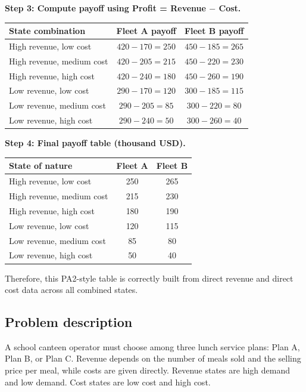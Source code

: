 \begin{ExamProblems}
		\textbf{Step 3: Compute payoff using Profit = Revenue $-$ Cost.}
		\begin{center}
			\begin{tabular}{l c c}
				\toprule
				State combination & Fleet A payoff & Fleet B payoff \\
				\midrule
				High revenue, low cost & $420-170=250$ & $450-185=265$ \\
				High revenue, medium cost & $420-205=215$ & $450-220=230$ \\
				High revenue, high cost & $420-240=180$ & $450-260=190$ \\
				Low revenue, low cost & $290-170=120$ & $300-185=115$ \\
				Low revenue, medium cost & $290-205=85$ & $300-220=80$ \\
				Low revenue, high cost & $290-240=50$ & $300-260=40$ \\
				\bottomrule
			\end{tabular}
		\end{center}
		
		\textbf{Step 4: Final payoff table (thousand USD).}
		\begin{center}
			\begin{tabular}{l c c}
				\toprule
				State of nature & Fleet A & Fleet B \\
				\midrule
				High revenue, low cost & 250 & 265 \\
				High revenue, medium cost & 215 & 230 \\
				High revenue, high cost & 180 & 190 \\
				Low revenue, low cost & 120 & 115 \\
				Low revenue, medium cost & 85 & 80 \\
				Low revenue, high cost & 50 & 40 \\
				\bottomrule
			\end{tabular}
		\end{center}
		
		Therefore, this PA2-style table is correctly built from direct revenue and direct cost data across all combined states.
		
		\item
		\subsection*{Problem description}
		A school canteen operator must choose among three lunch service plans: Plan A, Plan B, or Plan C.
		Revenue depends on the number of meals sold and the selling price per meal, while costs are given directly.
		Revenue states are high demand and low demand. Cost states are low cost and high cost.
		

\end{ExamProblems}
